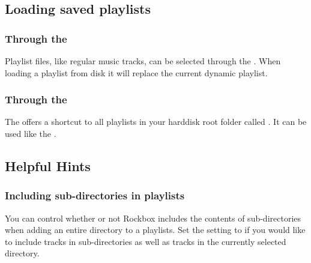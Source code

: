 \subsection{Loading saved playlists}
\subsubsection{Through the }
Playlist files, like regular music tracks, can be selected through the 
. When loading a playlist from disk it will replace
the current dynamic playlist.

\subsubsection{Through the }
The  offers a shortcut to all playlists in your
\daps{} harddisk root folder called .
It can be used like the .

\subsection{Helpful Hints}

\subsubsection{Including sub-directories in playlists}
You can control whether or not Rockbox includes the contents of
sub-directories when adding an entire directory to a playlists.
Set the  setting to  if you
would like to include tracks in sub-directories as well as tracks in the
currently selected directory.
